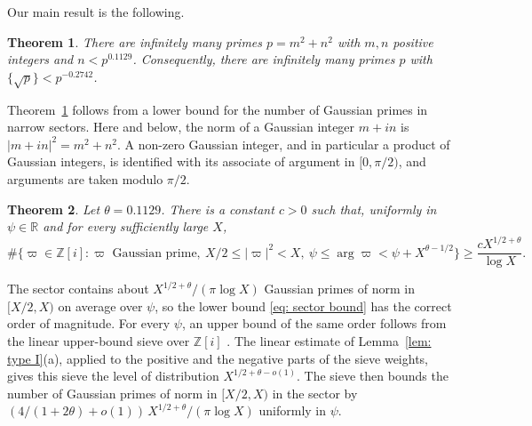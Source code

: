 \documentclass{article}
\numberwithin{equation}{section}
\newtheorem{theorem}{Theorem}
\newcommand{\Le}{\leqslant}
\newcommand{\Ge}{\geqslant}
\begin{document}
Our main result is the following.

\begin{theorem}
\label{thm: primes}
There are infinitely many primes $p = m^2 + n^2$ with $m, n$ positive integers and $n < p^{0.1129}$. Consequently, there are infinitely many primes $p$ with $\{\sqrt{p}\} < p^{-0.2742}$.
\end{theorem}

Theorem~\ref{thm: primes} follows from a lower bound for the number of Gaussian primes in narrow sectors. Here and below, the norm of a Gaussian integer $m + in$ is $|m + in|^2 = m^2 + n^2$. A non-zero Gaussian integer, and in particular a product of Gaussian integers, is identified with its associate of argument in $[0, \pi/2)$, and arguments are taken modulo $\pi/2$.

\begin{theorem}
\label{thm: sector}
Let $\theta = 0.1129$. There is a constant $c > 0$ such that, uniformly in $\psi \in \mathbb{R}$ and for every sufficiently large $X$,
\begin{equation}
\label{eq: sector bound}
\#\bigl\{ \varpi \in \mathbb{Z}[i] : \varpi \text{ Gaussian prime},\ X/2 \Le |\varpi|^2 < X,\ \psi \Le \arg \varpi < \psi + X^{\theta - 1/2} \bigr\} \Ge \frac{c X^{1/2 + \theta}}{\log X}.
\end{equation}
\end{theorem}

The sector contains about $X^{1/2 + \theta}/(\pi \log X)$ Gaussian primes of norm in $[X/2, X)$ on average over $\psi$, so the lower bound \eqref{eq: sector bound} has the correct order of magnitude. For every $\psi$, an upper bound of the same order follows from the linear upper-bound sieve over $\mathbb{Z}[i]$ \citep[Lemma~3]{coleman1993rosser}. The linear estimate of Lemma~\ref{lem: type I}(a), applied to the positive and the negative parts of the sieve weights, gives this sieve the level of distribution $X^{1/2 + \theta - o(1)}$. The sieve then bounds the number of Gaussian primes of norm in $[X/2, X)$ in the sector by $(4/(1 + 2\theta) + o(1))\, X^{1/2 + \theta}/(\pi \log X)$ uniformly in $\psi$.
\end{document}
